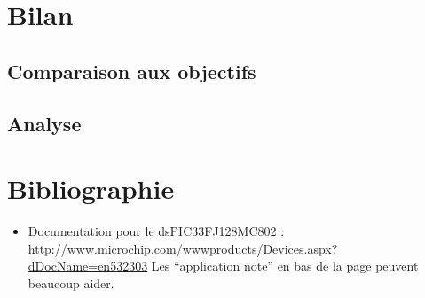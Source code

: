 \documentclass[a4,french,12pt]{article}
\begin{document}
\newpage
\section{Bilan}
\subsection{Comparaison aux objectifs}
\subsection{Analyse}

\newpage
\section{Bibliographie}
\begin{itemize}
  \item Documentation pour le dsPIC33FJ128MC802 : \\
    \href{http://www.microchip.com/wwwproducts/Devices.aspx?dDocName=en532302}
         {http://www.microchip.com/wwwproducts/Devices.aspx?dDocName=en532303} 
    Les ``application note'' en bas de la page peuvent beaucoup aider.
\end{itemize}
\end{document}
